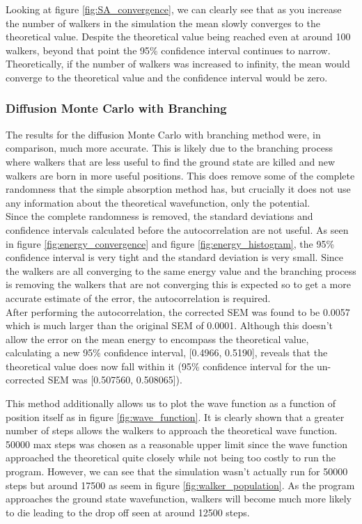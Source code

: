 \documentclass[reqno]{amsart}
\numberwithin{equation}{section}
\numberwithin{figure}{section}
\begin{document}
Looking at figure \ref{fig:SA_convergence}, we can clearly see that as you increase the number of walkers in the simulation the mean slowly converges to the theoretical value. Despite the theoretical value being reached even at around 100 walkers, beyond that point the 95\% confidence interval continues to narrow. Theoretically, if the number of walkers was increased to infinity, the mean would converge to the theoretical value and the confidence interval would be zero. \\

\subsubsection{Diffusion Monte Carlo with Branching}

The results for the diffusion Monte Carlo with branching method were, in comparison, much more accurate. This is likely due to the branching process where walkers that are less useful to find the ground state are killed and new walkers are born in more useful positions. This does remove some of the complete randomness that the simple absorption method has, but crucially it does not use any information about the theoretical wavefunction, only the potential. \\

Since the complete randomness is removed, the standard deviations and confidence intervals calculated before the autocorrelation are not useful. As seen in figure \ref{fig:energy_convergence} and figure \ref{fig:energy_histogram}, the 95\% confidence interval is very tight and the standard deviation is very small. Since the walkers are all converging to the same energy value and the branching process is removing the walkers that are not converging this is expected so to get a more accurate estimate of the error, the autocorrelation is required. \\

After performing the autocorrelation, the corrected SEM was found to be 0.0057 which is much larger than the original SEM of 0.0001. Although this doesn't allow the error on the mean energy to encompass the theoretical value, calculating a new 95\% confidence interval, [0.4966, 0.5190], reveals that the theoretical value does now fall within it (95\% confidence interval for the un-corrected SEM was [0.507560, 0.508065]).

This method additionally allows us to plot the wave function as a function of position itself as in figure \ref{fig:wave_function}. It is clearly shown that a greater number of steps allows the walkers to approach the theoretical wave function. 50000 max steps was chosen as a reasonable upper limit since the wave function approached the theoretical quite closely while not being too costly to run the program. However, we can see that the simulation wasn't actually run for 50000 steps but around 17500 as seem in figure \ref{fig:walker_population}. As the program approaches the ground state wavefunction, walkers will become much more likely to die leading to the drop off seen at around 12500 steps.
\end{document}
